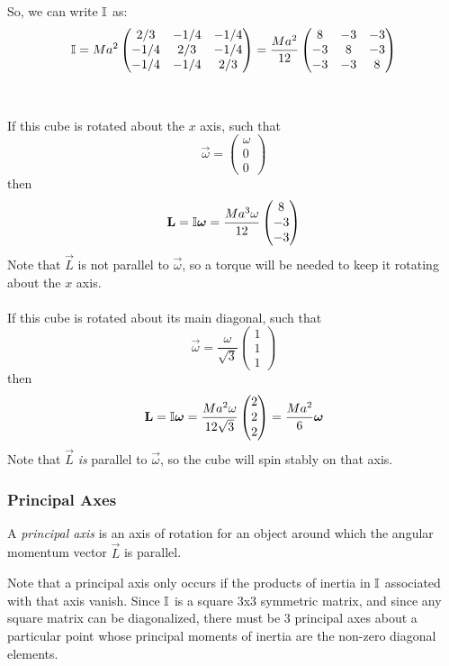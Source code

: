 \documentclass[a4paper]{article}
\begin{document}
\begin{eg}
	So, we can write $\mathbb{I}$ as:
	\[
		\mathbb{I} = Ma^2
		\begin{pmatrix}
			2/3 & -1/4 & -1/4\\
			-1/4 & 2/3 & -1/4\\
			-1/4 & -1/4 & 2/3
		\end{pmatrix}
		= \frac{Ma^2}{12}
		\begin{pmatrix}
			8 & -3 & -3\\
			-3 & 8 & -3\\
			-3 & -3 & 8
		\end{pmatrix}
	\]\\~\\
	If this cube is rotated about the $x$ axis, such that
	\[ \vec{\omega} = \begin{pmatrix}\omega\\0\\0\end{pmatrix} \]
	then
	\begin{align*}
		\boldsymbol{\mathbf{L}} = \mathbb{I}\boldsymbol{\mathbf{\omega}} = \frac{Ma^3\omega}{12}
		\begin{pmatrix}8\\-3\\-3\end{pmatrix}
	\end{align*}
	Note that $\vec{L}$ is not parallel to $\vec{\omega}$, so a torque will
	be needed to keep it rotating about the $x$ axis.\\~\\
	If this cube is rotated about its main diagonal, such that
	\[ \vec{\omega}=\frac{\omega}{\sqrt{3}}
	\begin{pmatrix}1\\1\\1\end{pmatrix} \]
	then 
	\begin{align*}
		\boldsymbol{\mathbf{L}} = \mathbb{I}\boldsymbol{\mathbf{\omega}} = \frac{Ma^2\omega}{12\sqrt{3}}
			\begin{pmatrix}2\\2\\2\end{pmatrix} = 
			\frac{Ma^2}{6}\boldsymbol{\mathbf{\omega}}
	\end{align*}
	Note that $\vec{L}$ \emph{is} parallel to $\vec{\omega}$, so the cube
	will spin stably on that axis.
\end{eg}

\subsubsection{Principal Axes}
\begin{defi}
	A \emph{principal axis} is an axis of rotation for an object around
	which the angular momentum vector $\vec{L}$ is parallel.
\end{defi}
Note that a principal axis only occurs if the products of inertia in $\mathbb{I}$
associated with that axis vanish. Since $\mathbb{I}$ is a square 3x3 symmetric matrix,
and since any square matrix can be diagonalized, there must be 3 principal
axes about a particular point whose principal moments of inertia are the
non-zero diagonal elements.
\end{document}
